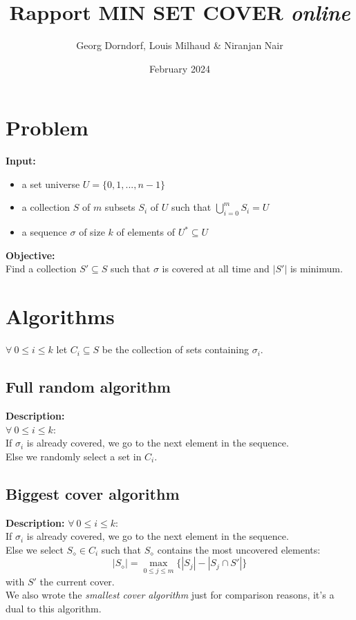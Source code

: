 \documentclass{article}
\title{Rapport MIN SET COVER \emph{online}}
\author{Georg Dorndorf, Louis Milhaud \& Niranjan Nair}
\date{February 2024}
\begin{document}
\maketitle

\section{Problem}
\textbf{Input:}
\begin{itemize}
    \item a set universe $U = \{0, 1, ..., n-1\}$
    \item a collection $S$ of $m$ subsets $S_i$ of $U$ such that $\bigcup\limits_{i = 0}^m S_i = U$
    \item a sequence $\sigma$ of size $k$ of elements of $U^* \subseteq U$
\end{itemize}
\textbf{Objective:}\\
Find a collection $S' \subseteq S$ such that $\sigma$ is covered at all time and $|S'|$ is minimum.

\section{Algorithms}
$\forall\ 0 \leq i \leq k$ let $C_i \subseteq S$ be the collection of sets containing $\sigma_i$.\\
\subsection{Full random algorithm}
\textbf{Description:}\\
$\forall\ 0 \leq i \leq k$:\\
If $\sigma_i$ is already covered, we go to the next element in the sequence.\\
Else we randomly select a set in $C_i$.

\subsection{Biggest cover algorithm}
\textbf{Description:}
$\forall\ 0 \leq i \leq k$:\\
If $\sigma_i$ is already covered, we go to the next element in the sequence.\\
Else we select $S_\diamond\in C_i$ such that $S_\diamond$ contains the most uncovered elements:
$$|S_\diamond| = \max_{0\leq j\leq m}\{|S_j| - |S_j\cap S'|\}$$ with $S'$ the current cover.\\

We also wrote the \emph{smallest cover algorithm} just for comparison reasons, it's a dual to this algorithm.\\
\end{document}

